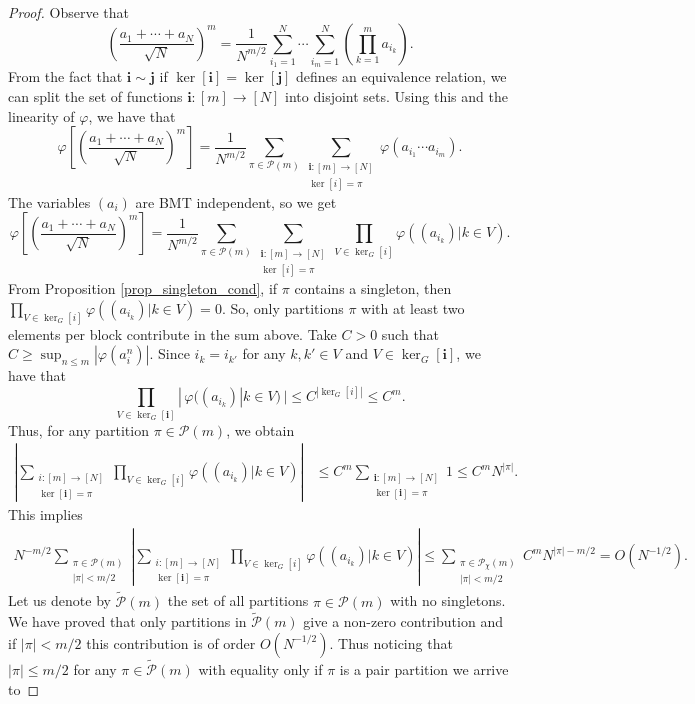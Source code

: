 \documentclass[a4paper,12pt]{extarticle}
\theoremstyle{definition}
\theoremstyle{remark}
\newcommand{\abs}[1]{\left\vert {#1} \right\vert}
\begin{document}
\begin{proof}
	Observe that
	$$\left( \frac{a_1+\cdots+a_N}{\sqrt{N}}\right)^m=\frac{1}{N^{m/2}}\sum\limits_{i_1=1}^{N}\cdots \sum\limits_{i_m=1}^{N} \left(\prod_{k=1}^m a_{i_k}\right).$$
	From the fact that $\bm{i}\sim \bm{j}$ if $\ker[\bm{i}]=\ker[\bm{j}]$ defines an equivalence relation, we can split the set of functions $\bm{i}:[m]\to [N]$ into disjoint sets. Using this and the linearity of $\varphi$, we have that
	$$\varphi\left[\left( \frac{a_1+\cdots+a_N}{\sqrt{N}}\right)^m\right]=\frac{1}{N^{m/2}}\sum\limits_{\pi \in \mathcal{P}(m)} \sum\limits_{\substack{\bm{i}:[m]\to [N] \\ \ker[i]=\pi}} \varphi(a_{i_1}\cdots a_{i_m}).$$
	The variables $(a_i)$ are BMT independent, so we get 
	$$\varphi\left[\left( \frac{a_1+\cdots+a_N}{\sqrt{N}}\right)^m\right]=\frac{1}{N^{m/2}}\sum\limits_{\pi \in \mathcal{P}(m)} \sum\limits_{\substack{\bm{i}:[m]\to [N] \\ \ker[i]=\pi}} \prod_{V\in \ker_G[i]} \varphi((a_{i_k})| k\in V).$$
	From Proposition \ref{prop_singleton_cond}, if $\pi$ contains a singleton, then $\prod_{V\in \ker_G[i]} \varphi((a_{i_k})| k\in V)=0$. 
	So, only partitions $\pi$ with at least two elements per block contribute in the sum above. %
	Take $C>0$ such that $C\geq \sup_{n\leq m} |\varphi(a_i^n)|$. Since $i_k=i_{k'}$ for any $k,k' \in V$ and $V \in \ker_G[\bm{i}]$, we have that
	$$\prod_{V\in \ker_G[\bm{i}]} | \, \varphi((a_{i_k})|k\in V) \, |\leq C^{|\ker_G[i]|}\leq C^m.$$
	Thus, for any partition $\pi\in \mathcal{P}(m)$, we obtain
	\begin{align*}
		\abs{\sum\limits_{\substack{i:[m]\to [N] \\ \ker[\bm{i}]=\pi}} \prod_{V\in \ker_G[i]} \varphi((a_{i_k})| k\in V) } &\leq C^m\sum\limits_{\substack{\bm{i}:[m]\to [N] \\ \ker[\bm{i}]=\pi}} 1\leq C^m N^{|\pi|}.
	\end{align*}
	This implies 
	\begin{align*}
		N^{-m/2} \sum\limits_{\substack{\pi\in \mathcal{P}(m) \\ |\pi|<m/2}}
		\abs{\sum\limits_{\substack{i:[m]\to [N] \\ \ker[\bm{i}]=\pi}} \prod_{V\in \ker_G[i]} \varphi((a_{i_k})| k\in V) } \leq \sum\limits_{\substack{\pi\in \mathcal{P}_\chi (m) \\ |\pi|<m/2}} C^m N^{|\pi|-m/2}=O(N^{-1/2}).
	\end{align*}
 	Let us denote by $\tilde{\mathcal{P}}(m)$ the set of all partitions $\pi \in \mathcal{P}(m)$ with no singletons.  We have proved that only partitions in  $\tilde{\mathcal{P}}(m)$ give a non-zero contribution and if $|\pi|< m/2$ this contribution is of order  $O(N^{-1/2})$.  Thus noticing that  $|\pi|\leq m/2$ for any $\pi \in \tilde{\mathcal{P}}(m)$ with equality only if $\pi$ is a pair partition we arrive to 

\end{proof}
\end{document}
